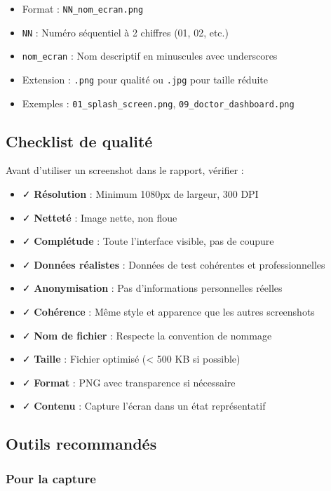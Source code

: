 \documentclass[a4paper,11pt]{report}
\begin{document}
\begin{itemize}
    \item Format : \texttt{NN\_nom\_ecran.png}
    \item \texttt{NN} : Numéro séquentiel à 2 chiffres (01, 02, etc.)
    \item \texttt{nom\_ecran} : Nom descriptif en minuscules avec underscores
    \item Extension : \texttt{.png} pour qualité ou \texttt{.jpg} pour taille réduite
    \item Exemples : \texttt{01\_splash\_screen.png}, \texttt{09\_doctor\_dashboard.png}
\end{itemize}

\subsection{Checklist de qualité}

Avant d'utiliser un screenshot dans le rapport, vérifier :

\begin{itemize}
    \item ✓ \textbf{Résolution} : Minimum 1080px de largeur, 300 DPI
    \item ✓ \textbf{Netteté} : Image nette, non floue
    \item ✓ \textbf{Complétude} : Toute l'interface visible, pas de coupure
    \item ✓ \textbf{Données réalistes} : Données de test cohérentes et professionnelles
    \item ✓ \textbf{Anonymisation} : Pas d'informations personnelles réelles
    \item ✓ \textbf{Cohérence} : Même style et apparence que les autres screenshots
    \item ✓ \textbf{Nom de fichier} : Respecte la convention de nommage
    \item ✓ \textbf{Taille} : Fichier optimisé (< 500 KB si possible)
    \item ✓ \textbf{Format} : PNG avec transparence si nécessaire
    \item ✓ \textbf{Contenu} : Capture l'écran dans un état représentatif
\end{itemize}

\subsection{Outils recommandés}

\subsubsection{Pour la capture}
\end{document}
